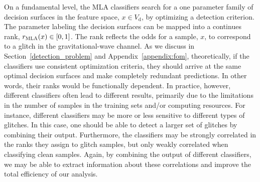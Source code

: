 \documentclass[prd, twocolumn, lengthcheck, superscriptaddress, showpacs, letterpaper, nofootinbib]{revtex4-1}
\newcommand\given{\,\,|\,}
\newcommand\auxvec{x}
\newcommand\Vdata{V_\mathrm{d}}
\newcommand\MLArank{r_{\textsc{MLA}}}
\begin{document}



On a fundamental level, the \ac{MLA} classifiers search for a one parameter family of decision surfaces in the feature space, $\auxvec \in \Vdata$, by optimizing a detection criterion. The parameter labeling the decision surfaces can be mapped into a continues rank, $\MLArank(\auxvec) \in [0,1]$. The rank reflects the odds for a sample, $\auxvec$, to correspond to a glitch in the gravitational-wave channel. As we discuss in Section~\ref{detection_problem} and Appendix~\ref{appendix:fom}, theoretically, if the classifiers use consistent optimization criteria, they should arrive at the same optimal decision surfaces and make completely redundant predictions. In other words, their ranks would be functionally dependent. In practice, however, different classifiers often lead to different results, primarily due to the limitations in the number of samples in the training sets and/or computing resources. For instance, different classifiers may be more or less sensitive to different types of glitches. In this case, one should be able to detect a larger set of glitches by combining their output. Furthermore, the classifiers may be strongly correlated in the ranks they assign to glitch samples, but only weakly correlated when classifying clean samples. Again, by combining the output of different classifiers, we may be able to extract information about these correlations and improve the total efficiency of our analysis.
\end{document}
